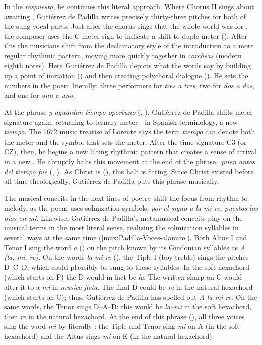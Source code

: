 In the \emph{respuesta}, he continues this literal approach.
Where Chorus II sings about awaiting , Gutiérrez de
Padilla writes precisely thirty-three pitches for both of the sung vocal parts.
Just after the chorus sings that the whole world was  for
, the composer uses the C meter sign to indicate a shift to
duple meter ().
After this the musicians shift from the declamatory style of the introduction to
a more regular rhythmic pattern, moving more quickly together in \emph{corcheas}
(modern eighth notes).
Here Gutiérrez de Padilla depicts what the words say by building up a point of
imitation  () and then
creating polychoral dialogue ().
He sets the numbers in the poem literally: three performers for \emph{tres a
tres}, two for \emph{dos a dos}, and one for \emph{uno a uno}.

At the phrase \emph{y aguardan tiempo oportuno} (, ), Gutiérrez de Padilla shifts meter signature
again, returning to ternary meter---in Spanish terminology, a new \emph{tiempo}.
The 1672 music treatise of Lorente says the term \emph{tiempo} can denote both
the meter and the symbol that sets the meter.%
    \Autocite[bk.~2, 149]{Lorente:Porque}
After the time signature C3 (or CZ), then, he begins a new lilting rhythmic
pattern that creates a sense of arrival in a new .
He abruptly halts this movement at the end of the phrase, \emph{quien antes del
tiempo fue} (, ).
As Christ is  (), this halt is
fitting.  
Since Christ existed before all time theologically, Gutiérrez de Padilla puts
this phrase  musically.

The musical conceits in the next lines of poetry shift the focus from rhythm to
melody, as the poem uses solmization symbols: \emph{por el signo a la mi re,
puestos los ojos en mi}.
Likewise, Gutiérrez de Padilla's metamusical conceits play on the musical terms
in the most literal sense, realizing the solmization syllables in several ways
at the same time (\cref{mux:Padilla-Voces-alamire}).
Both Altus I and Tenor I sing the word \emph{a} () on the pitch
known by its Guidonian syllables as \emph{A (la, mi, re)}.
On the words \emph{la mi re} (), the Tiple I (boy treble) sings
the pitches D--C\sh{}--D, which could plausibly be sung to those syllables.
In the soft hexachord (which starts on F) the D would in fact be \emph{la}.
The written sharp on C would alter it to a \emph{mi} in \emph{musica ficta}. 
The final D could be \emph{re} in the natural hexachord (which starts on C);
thus, Gutiérrez de Padilla has spelled out \emph{A la mi re}.
On the same words, the Tenor sings D--A--D: this would be \emph{la--mi} in the
soft hexachord, then \emph{re} in the natural hexachord.
At the end of this phrase (), all three voices sing the word
\emph{mi} by literally : the Tiple and
Tenor sing \emph{mi} on A (in the soft hexachord) and the Altus sings \emph{mi}
on E (in the natural hexachord).

